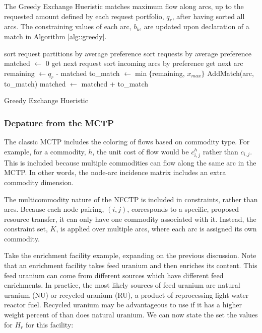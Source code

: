 The Greedy Exchange Hueristic matches maximum flow along arcs, up to the
requested amount defined by each request portfolio, $q_r$, after having sorted
all arcs. The constraining values of each arc, $b_k$, are updated upon
declaration of a match in Algorithm \ref{alg::greedy}.

\begin{algorithm}[!h]
 \SetAlgoLined
 sort request partitions by average preference\;
  {
   sort requests by average preference\;
   matched $\leftarrow$ 0\;        
    {
     get next request\;
     sort incoming arcs by preference\;
      {
       get next arc\;
       remaining $\leftarrow q_r$ - matched\;
       to\_match $\leftarrow \min \lbrace$remaining, $x_{max} \rbrace$\;
       AddMatch(arc, to\_match)\;
       matched $\leftarrow$ matched + to\_match\;
     }
   }
 }
 \caption{Greedy Exchange Hueristic}\label{alg::greedy}
\end{algorithm}

\subsubsection{Depature from the MCTP}

The classic MCTP includes the coloring of flows based on commodity type. For
example, for a commodity, $h$, the unit cost of flow would be $c^h_{i,j}$ rather
than $c_{i, j}$. This is included because multiple commodities can flow along
the same arc in the MCTP. In other words, the node-arc incidence matrix includes
an extra commodity dimension. 

The multicommodity nature of the NFCTP is included in constraints, rather than
arcs. Because each node pairing, $(i, j)$, corresponds to a specific, proposed
resource transfer, it can only have one commodity associated with it. Instead,
the constraint set, $K$, is applied over multiple arcs, where each arc is
assigned its own commodity. 

Take the enrichment facility example, expanding on the previous discussion. Note
that an enrichment facility takes feed uranium and then enriches its
 content. This feed uranium can come from different sources which
have different feed enrichments. In practice, the most likely sources of feed
uranium are natural uranium (NU) or recycled uranium (RU), a product of
reprocessing light water reactor fuel. Recycled uranium may be advantageous to
use if it has a higher weight percent of  than does natural
uranium. We can now state the set the values for $H_{r}$ for this facility:

